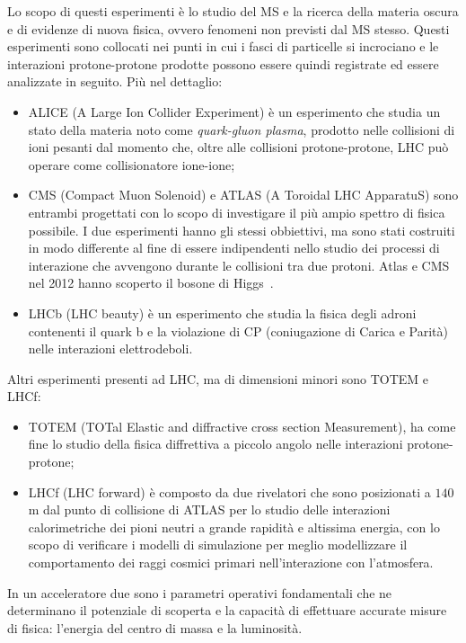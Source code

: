 Lo scopo di questi esperimenti è lo studio del MS e la ricerca della materia oscura e di evidenze di nuova fisica, ovvero fenomeni non previsti dal MS stesso. Questi esperimenti sono collocati nei punti in cui i fasci di particelle si incrociano e le interazioni protone-protone prodotte possono essere quindi registrate ed essere analizzate in seguito. Pi\`u nel dettaglio:
\begin{itemize}
\item ALICE (A Large Ion Collider Experiment) \`e un esperimento che studia un stato della materia noto come {\em quark-gluon plasma}, prodotto nelle collisioni di ioni pesanti dal momento che, oltre alle collisioni protone-protone, LHC pu\`o operare come collisionatore ione-ione;
\item CMS (Compact Muon Solenoid) e ATLAS (A Toroidal LHC ApparatuS) sono entrambi progettati con lo scopo di investigare il più ampio spettro di fisica possibile. I due esperimenti hanno gli stessi obbiettivi, ma sono stati costruiti in modo differente al fine di essere indipendenti nello studio dei processi di interazione che avvengono durante le collisioni tra due protoni. Atlas e CMS nel 2012 hanno scoperto il bosone di Higgs~\cite{scopertahiggs}. 
\item LHCb (LHC beauty) \`e un esperimento che studia la fisica degli adroni contenenti il quark b e la violazione di CP (coniugazione di Carica e Parità) nelle interazioni elettrodeboli.
\end{itemize}
Altri esperimenti presenti ad LHC, ma di dimensioni minori sono TOTEM e LHCf:
\begin{itemize}
\item TOTEM (TOTal Elastic and diffractive cross section Measurement), ha come fine lo studio della fisica diffrettiva a piccolo angolo nelle interazioni protone-protone;
\item LHCf (LHC forward) è composto da due rivelatori che sono posizionati a $140$m dal punto di collisione di ATLAS per lo studio delle interazioni calorimetriche dei pioni neutri a grande rapidità e altissima energia, con lo scopo di verificare i modelli di simulazione per meglio modellizzare il comportamento dei raggi cosmici primari nell'interazione con l'atmosfera.
\end{itemize}

In un acceleratore due sono i parametri operativi fondamentali che ne determinano il potenziale di scoperta e la capacit\`a di effettuare accurate misure di fisica: l'energia del centro di massa e la luminosit\`a.

